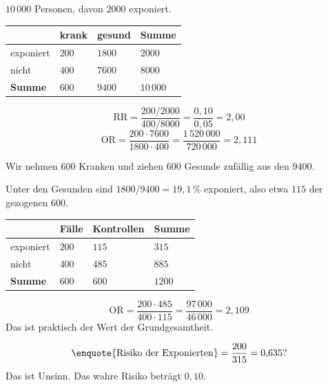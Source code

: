 \begin{merksatz}
$10\,000$ Personen, davon $2000$ exponiert.
\begin{center}
\renewcommand{\arraystretch}{1.48}
\begin{tabular}{@{}P{2.0cm}P{1.8cm}P{1.8cm}P{1.8cm}@{}}
\toprule
& \textbf{krank} & \textbf{gesund} & \textbf{Summe}\\
\midrule
exponiert & $200$ & $1800$ & $2000$\\
nicht & $400$ & $7600$ & $8000$\\
\midrule
\textbf{Summe} & $600$ & $9400$ & $10\,000$\\
\bottomrule
\end{tabular}
\end{center}

\[ \mathrm{RR} = \frac{200/2000}{400/8000} = \frac{0{,}10}{0{,}05} = 2{,}00 \]
\[ \mathrm{OR} = \frac{200 \cdot 7600}{1800 \cdot 400} = \frac{1\,520\,000}{720\,000} = 2{,}111 \]

Wir nehmen  $600$ Kranken und ziehen $600$ Gesunde zufällig aus den $9400$.

Unter den Gesunden sind $1800/9400 = 19{,}1\,\%$ exponiert, also etwa $115$ der gezogenen $600$.

\begin{center}
\renewcommand{\arraystretch}{1.48}
\begin{tabular}{@{}P{2.0cm}P{1.6cm}P{2.0cm}P{1.8cm}@{}}
\toprule
& \textbf{Fälle} & \textbf{Kontrollen} & \textbf{Summe}\\
\midrule
exponiert & $200$ & $115$ & $315$\\
nicht & $400$ & $485$ & $885$\\
\midrule
\textbf{Summe} & $600$ & $600$ & $1200$\\
\bottomrule
\end{tabular}
\end{center}

\[ \mathrm{OR} = \frac{200 \cdot 485}{400 \cdot 115} = \frac{97\,000}{46\,000} = 2{,}109 \]
Das ist praktisch der Wert der Grundgesamtheit. \checkmark

\[ \text{\enquote{Risiko der Exponierten}} = \frac{200}{315} = 0{,}635 ? \]
Das ist Unsinn. Das wahre Risiko beträgt $0{,}10$.


\end{merksatz}
